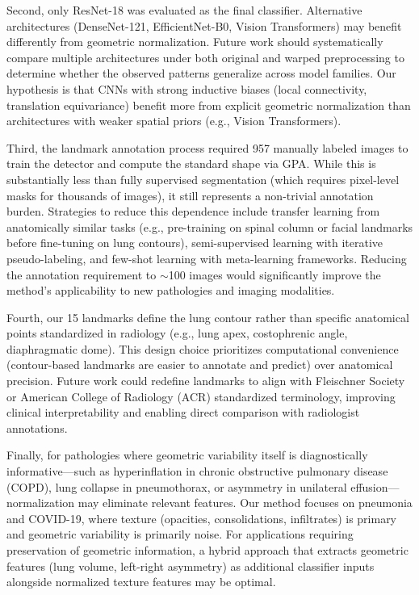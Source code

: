\documentclass[applsci,article,submit,pdftex,moreauthors]{Definitions/mdpi}
\begin{document}
Second, only ResNet-18 was evaluated as the final classifier. Alternative architectures (DenseNet-121, EfficientNet-B0, Vision Transformers) may benefit differently from geometric normalization. Future work should systematically compare multiple architectures under both original and warped preprocessing to determine whether the observed patterns generalize across model families. Our hypothesis is that CNNs with strong inductive biases (local connectivity, translation equivariance) benefit more from explicit geometric normalization than architectures with weaker spatial priors (e.g., Vision Transformers).

Third, the landmark annotation process required 957 manually labeled images to train the detector and compute the standard shape via GPA. While this is substantially less than fully supervised segmentation (which requires pixel-level masks for thousands of images), it still represents a non-trivial annotation burden. Strategies to reduce this dependence include transfer learning from anatomically similar tasks (e.g., pre-training on spinal column or facial landmarks before fine-tuning on lung contours), semi-supervised learning with iterative pseudo-labeling, and few-shot learning with meta-learning frameworks. Reducing the annotation requirement to $\sim$100 images would significantly improve the method's applicability to new pathologies and imaging modalities.

Fourth, our 15 landmarks define the lung contour rather than specific anatomical points standardized in radiology (e.g., lung apex, costophrenic angle, diaphragmatic dome). This design choice prioritizes computational convenience (contour-based landmarks are easier to annotate and predict) over anatomical precision. Future work could redefine landmarks to align with Fleischner Society or American College of Radiology (ACR) standardized terminology, improving clinical interpretability and enabling direct comparison with radiologist annotations.

Finally, for pathologies where geometric variability itself is diagnostically informative---such as hyperinflation in chronic obstructive pulmonary disease (COPD), lung collapse in pneumothorax, or asymmetry in unilateral effusion---normalization may eliminate relevant features. Our method focuses on pneumonia and COVID-19, where texture (opacities, consolidations, infiltrates) is primary and geometric variability is primarily noise. For applications requiring preservation of geometric information, a hybrid approach that extracts geometric features (lung volume, left-right asymmetry) as additional classifier inputs alongside normalized texture features may be optimal.
\end{document}

